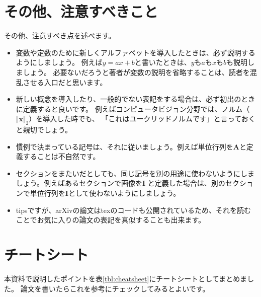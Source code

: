 \documentclass[uplatex,twocolumn,9pt,dvipdfmx]{jsarticle}
\newcommand{\Tref}[1]{表\ref{#1}}
\begin{document}
\section{その他、注意すべきこと}
その他、注意すべき点を述べます。
\begin{itemize}
\item 変数や定数のために新しくアルファベットを導入したときは、必ず説明するようにしましょう。
例えば$y=ax+b$と書いたときは、$y$も$a$も$x$も$b$も説明しましょう。
必要ないだろうと著者が変数の説明を省略することは、読者を混乱させる入口だと思います。
\item 新しい概念を導入したり、一般的でない表記をする場合は、必ず初出のときに定義すると良いです。
例えばコンピュータビジョン分野では、ノルム（$\Vert \mathbf{x} \Vert_2$）を導入した時でも、
「これはユークリッドノルムです」と言っておくと親切でしょう。
\item 慣例で決まっている記号は、それに従いましょう。例えば単位行列を$\mathbf{A}$と定義することは不自然です。
\item セクションをまたいだとしても、同じ記号を別の用途に使わないようにしましょう。例えばあるセクションで画像を$\mathbf{I}$
と定義した場合は、別のセクションで単位行列を$\mathbf{I}$として使わないようにしましょう。
\item tipsですが、arXivの論文はtexのコードも公開されているため、それを読むことでお気に入りの論文の表記を真似することも出来ます。
\end{itemize}

\section{チートシート}
本資料で説明したポイントを\Tref{tbl:cheatsheet}にチートシートとしてまとめました。
論文を書いたらこれを参考にチェックしてみるとよいです。
\end{document}
